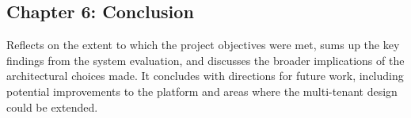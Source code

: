 \subsection*{Chapter 6: Conclusion}
Reflects on the extent to which the project objectives were met, sums up the key findings from the system evaluation, and discusses the broader implications of the architectural choices made. It concludes with directions for future work, including potential improvements to the platform and areas where the multi-tenant design could be extended.
